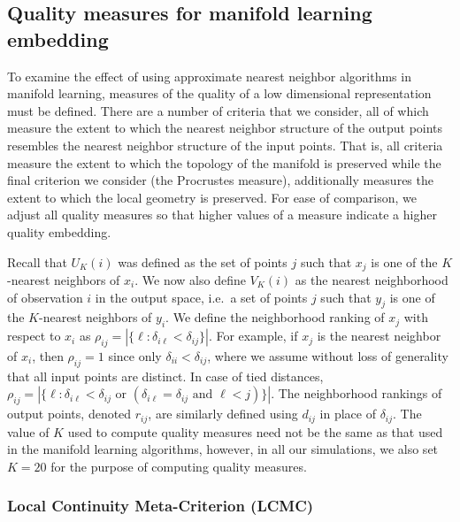 \documentclass[12pt]{article}
\begin{document}
\hypertarget{qualitymeasure}{%
\subsection{Quality measures for manifold learning embedding}\label{qualitymeasure}}

To examine the effect of using approximate nearest neighbor algorithms in manifold learning, measures of the quality of a low dimensional representation must be defined. There are a number of criteria that we consider, all of which measure the extent to which the nearest neighbor structure of the output points resembles the nearest neighbor structure of the input points. That is, all criteria measure the extent to which the topology of the manifold is preserved while the final criterion we consider (the Procrustes measure), additionally measures the extent to which the local geometry is preserved. For ease of comparison, we adjust all quality measures so that higher values of a measure indicate a higher quality embedding.

Recall that \(U_K(i)\) was defined as the set of points \(j\) such that \(x_j\) is one of the \(K\)-nearest neighbors of \(x_i\). We now also define \(V_K(i)\) as the nearest neighborhood of observation \(i\) in the output space, i.e.~a set of points \(j\) such that \(y_j\) is one of the \(K\)-nearest neighbors of \(y_i\). We define the neighborhood ranking of \(x_j\) with respect to \(x_i\) as \(\rho_{ij} =|\{\ell: \delta_{i \ell}<\delta_{i j}\} |\). For example, if \(x_j\) is the nearest neighbor of \(x_i\), then \(\rho_{ij}=1\) since only \(\delta_{ii}<\delta_{ij}\), where we assume without loss of generality that all input points are distinct. In case of tied distances, \(\rho_{ij} =\left|\big\{\ell: \delta_{i \ell}<\delta_{i j} \text { or }(\delta_{i \ell}=\delta_{i j} \text { and } \ell<j)\big\}\right|\). The neighborhood rankings of output points, denoted \(r_{ij}\), are similarly defined using \(d_{ij}\) in place of \(\delta_{ij}\). The value of \(K\) used to compute quality measures need not be the same as that used in the manifold learning algorithms, however, in all our simulations, we also set \(K=20\) for the purpose of computing quality measures.

\hypertarget{local-continuity-meta-criterion-lcmc}{%
\subsubsection*{Local Continuity Meta-Criterion (LCMC)}\label{local-continuity-meta-criterion-lcmc}}
\end{document}
